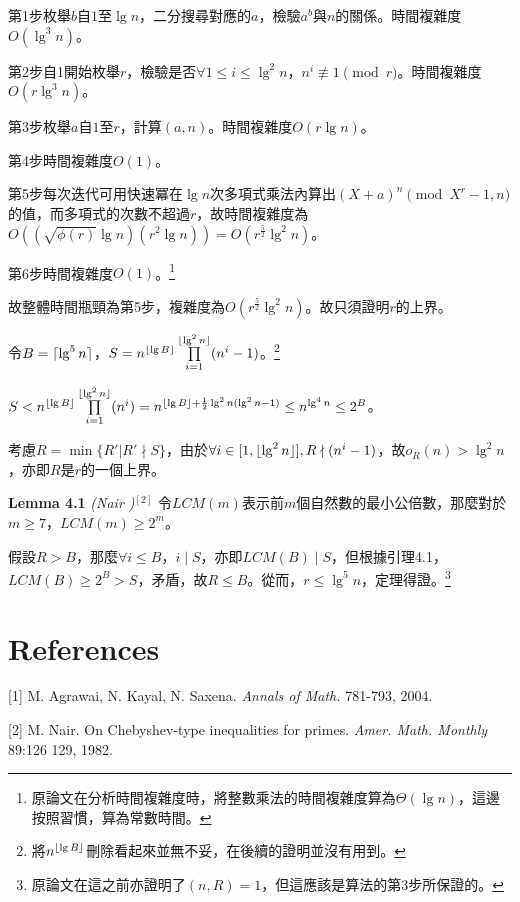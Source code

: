 \documentclass{article}
\DeclarePairedDelimiter\ceil{\lceil}{\rceil}
\DeclarePairedDelimiter\floor{\lfloor}{\rfloor}
\newcommand{\nequiv}{\not\equiv}
\begin{document}
    第1步枚舉$b$自$1$至$\lg n$，二分搜尋對應的$a$，檢驗$a^b$與$n$的關係。時間複雜度$O(\lg^3n)$。

    第2步自1開始枚舉$r$，檢驗是否$\forall 1\leq i\leq\lg^2n$，$n^i\nequiv 1\pmod{r}$。時間複雜度$O(r\lg^3n)$。

    第3步枚舉$a$自$1$至$r$，計算$(a,n)$。時間複雜度$O(r\lg n)$。

    第4步時間複雜度$O(1)$。

    第5步每次迭代可用快速冪在$\lg n$次多項式乘法內算出$(X+a)^n\pmod{X^r-1, n}$的值，而多項式的次數不超過$r$，故時間複雜度為$O((\sqrt{\phi(r)}\lg n)(r^2\lg n))=O(r^{\frac{5}{2}}\lg^2n)$。

    第6步時間複雜度$O(1)$。\footnote{原論文在分析時間複雜度時，將整數乘法的時間複雜度算為$\Theta(\lg n)$，這邊按照習慣，算為常數時間。}

    故整體時間瓶頸為第5步，複雜度為$O(r^{\frac{5}{2}}\lg^2n)$。故只須證明$r$的上界。

    令$B=\ceil{\lg^5n}$，$S=n^{\floor{\lg B}}\prod\limits_{i=1}^{\floor{\lg^2n}}(n^i-1)$。\footnote{將$n^{\floor{\lg B}}$刪除看起來並無不妥，在後續的證明並沒有用到。}

    $S<n^{\floor{\lg B}}\prod\limits_{i=1}^{\floor{\lg^2n}}(n^i)=n^{\floor{\lg B}+\frac{1}{2}\lg^2n(\lg^2n-1)}\leq n^{\lg^4n}\leq 2^B$。

    考慮$R=\min\{R'|R'\nmid S\}$，由於$\forall i\in[1, \floor{\lg^2n}], R\nmid(n^i-1)$，故$o_R(n)>\lg^2n$，亦即$R$是$r$的一個上界。

\begin{mdframed}
\noindent\textbf{Lemma 4.1} \textit{(Nair )}$^{[2]}$ 令$LCM(m)$表示前$m$個自然數的最小公倍數，那麼對於$m\geq 7$，$LCM(m)\geq 2^m$。
\end{mdframed}

    假設$R>B$，那麼$\forall i\leq B$，$i\mid S$，亦即$LCM(B)\mid S$，但根據引理4.1，$LCM(B)\geq 2^B>S$，矛盾，故$R\leq B$。從而，$r\leq \lg^5n$，定理得證。\footnote{原論文在這之前亦證明了$(n,R)=1$，但這應該是算法的第3步所保證的。}



\section{References}

    [1] M. Agrawai, N. Kayal, N. Saxena. \textit{Annals of Math.} 781-793, 2004.

    [2] M. Nair. On Chebyshev-type inequalities for primes. \textit{Amer. Math. Monthly} 89:126 129, 1982.
    
\end{document}
